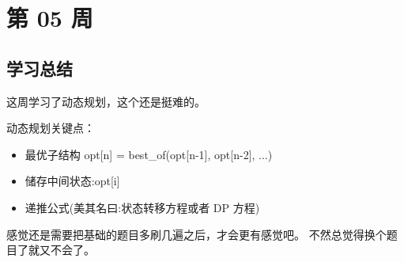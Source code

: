 \newpage
\section{第 05 周}



\subsection{学习总结}

这周学习了动态规划，这个还是挺难的。

动态规划关键点：

\begin{itemize}
  \item 最优子结构 opt[n] = best\_of(opt[n-1], opt[n-2], ...)
  \item 储存中间状态:opt[i]
  \item 递推公式(美其名曰:状态转移方程或者 DP 方程)
\end{itemize}

感觉还是需要把基础的题目多刷几遍之后，才会更有感觉吧。
不然总觉得换个题目了就又不会了。
